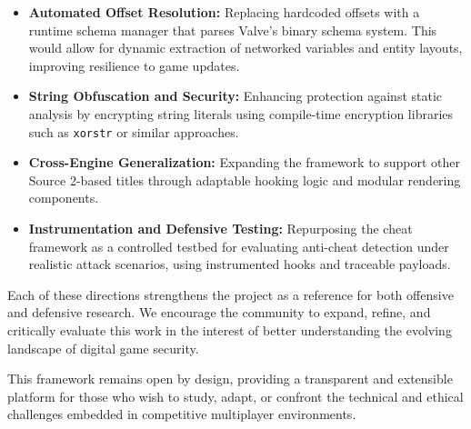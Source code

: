 \begin{itemize}
  \item \textbf{Automated Offset Resolution:} Replacing hardcoded offsets with a runtime schema manager that parses Valve's binary schema system. This would allow for dynamic extraction of networked variables and entity layouts, improving resilience to game updates.

  \item \textbf{String Obfuscation and Security:} Enhancing protection against static analysis by encrypting string literals using compile-time encryption libraries such as \texttt{xorstr} or similar approaches.

  \item \textbf{Cross-Engine Generalization:} Expanding the framework to support other Source 2-based titles through adaptable hooking logic and modular rendering components.

  \item \textbf{Instrumentation and Defensive Testing:} Repurposing the cheat framework as a controlled testbed for evaluating anti-cheat detection under realistic attack scenarios, using instrumented hooks and traceable payloads.
\end{itemize}

Each of these directions strengthens the project as a reference for both offensive and defensive research. We encourage the community to expand, refine, and critically evaluate this work in the interest of better understanding the evolving landscape of digital game security.

This framework remains open by design, providing a transparent and extensible platform for those who wish to study, adapt, or confront the technical and ethical challenges embedded in competitive multiplayer environments.